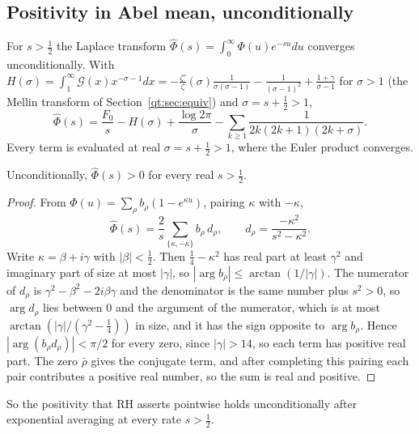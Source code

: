 \subsection{Positivity in Abel mean, unconditionally}
For $s>\tfrac12$ the Laplace transform $\hat\Phi(s)=\int_0^\infty\Phi(u)e^{-su}du$ converges unconditionally. With $H(\sigma)=\int_1^\infty\mathcal G(x)x^{-\sigma-1}dx=-\frac{\zeta'}{\zeta}(\sigma)\frac1{\sigma(\sigma-1)}-\frac1{(\sigma-1)^2}+\frac{1+\gamma}{\sigma-1}$ for $\sigma>1$ (the Mellin transform of Section~\ref{qt:sec:equiv}) and $\sigma=s+\tfrac12>1$,
\begin{equation}\label{st:eq:phihat}
\hat\Phi(s)=\frac{F_0}s-H(\sigma)+\frac{\log2\pi}{\sigma}-\sum_{k\ge1}\frac1{2k(2k+1)(2k+\sigma)} .
\end{equation}
Every term is evaluated at real $\sigma=s+\tfrac12>1$, where the Euler product converges.
\begin{theorem}\label{st:thm:abel}
Unconditionally, $\hat\Phi(s)>0$ for every real $s>\tfrac12$.
\end{theorem}
\begin{proof}
From $\Phi(u)=\sum_\rho b_\rho(1-e^{\kappa u})$, pairing $\kappa$ with $-\kappa$,
\[
\hat\Phi(s)=\frac2s\sum_{\{\kappa,-\kappa\}}b_\rho\,d_\rho,\qquad d_\rho=\frac{-\kappa^2}{s^2-\kappa^2}.
\]
Write $\kappa=\beta+i\gamma$ with $|\beta|<\tfrac12$. Then $\tfrac14-\kappa^2$ has real part at least $\gamma^2$ and imaginary part of size at most $|\gamma|$, so $|\arg b_\rho|\le\arctan(1/|\gamma|)$. The numerator of $d_\rho$ is $\gamma^2-\beta^2-2i\beta\gamma$ and the denominator is the same number plus $s^2>0$, so $\arg d_\rho$ lies between $0$ and the argument of the numerator, which is at most $\arctan(|\gamma|/(\gamma^2-\tfrac14))$ in size, and it has the sign opposite to $\arg b_\rho$. Hence $|\arg(b_\rho d_\rho)|<\pi/2$ for every zero, since $|\gamma|>14$, so each term has positive real part. The zero $\bar\rho$ gives the conjugate term, and after completing this pairing each pair contributes a positive real number, so the sum is real and positive.
\end{proof}
So the positivity that RH asserts pointwise holds unconditionally after exponential averaging at every rate $s>\tfrac12$.

